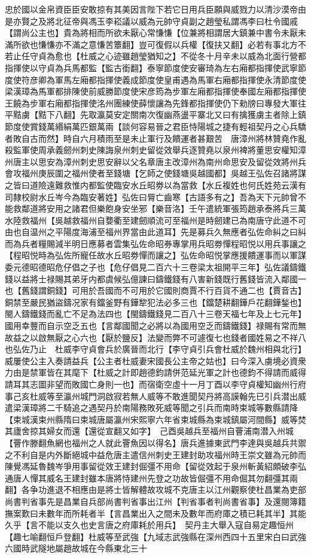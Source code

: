 忠於國以金帛資臣臣安敢掠有其美因言陛下若它日用兵臣願與威戮力以清沙漠帝由是亦賢之及將北征帝與馮玉李崧議以威為元帥守貞副之趙瑩私謂馮李曰杜令國戚【謂尚公主也】貴為將相而所欲未厭心常慊慊【位兼將相謂居大鎮兼中書令未厭未滿所欲也慊慊亦不滿之意慊苦簟翻】豈可復假以兵權【復扶又翻】必若有事北方不若止任守貞為愈也【杜威之心迹雖趙瑩猶知之】不從冬十月辛未以威為北面行營都指揮使以守貞為兵馬都監【監古銜翻】泰寧節度使安審琦為左右廂都指揮使武寧節度使符彦卿為軍馬左廂都指揮使義成節度使皇甫遇為馬軍右廂都指揮使永清節度使梁漢璋為馬軍都排陳使前威勝節度使宋彦筠為步軍左廂都指揮使奉國左廂都指揮使王饒為步軍右廂都指揮使洺州團練使薛懷讓為先鋒都指揮使仍下勑牓曰專發大軍往平黠虜【黠下八翻】先取瀛莫安定關南次復幽燕盪平寨北又曰有擒獲虜主者除上鎮節度使賞錢萬緡絹萬匹銀萬兩【談何容易晉之君臣恃陽城之捷有輕祖契丹之心兵驕者敗自古而然】時自六月積雨至是未止軍行及饋運者甚艱苦　唐漳州將林贊堯作亂殺監軍使周承義劒州刺史陳誨泉州刺史留從效舉兵逐贊堯以泉州裨將董思安權知漳州唐主以思安為漳州刺史思安辭以父名章唐主改漳州為南州命思安及留從效將州兵會攻福州庚辰圍之福州使者至錢塘【乞師之使錢塘吳越國都】吳越王弘佐召諸將謀之皆曰道險遠難救惟内都監使臨安水丘昭劵以為當救【水丘複姓也何氏姓苑云漢有司隸校尉水丘岑今為臨安著姓】弘佐曰脣亡齒寒【古語多有之】吾為天下元帥曾不能救鄰道將安用之諸君但樂飽身安坐邪【樂音洛】壬午遣統軍張筠趙承泰將兵三萬水陸救福州【吳越救福州自㜈衢至建劒順流可至福州是時劒建已為南唐守此道不可由也自温州之平陽度海浦至福州界當由此道耳】先是募兵久無應者弘佐命糾之曰糾而為兵者糧賜減半明日應募者雲集弘佐命昭券專掌用兵昭劵憚程昭悦以用兵事讓之【程昭悦時為弘佐所寵任故水丘昭劵憚而讓之】弘佐命昭悦掌應援饋運事而以軍謀委元德昭德昭危仔倡之子也【危仔倡見二百六十三卷梁太祖開平三年】弘佐議鑄鐵錢以益將士禄賜其弟牙内都虞候弘億諫曰鑄鐵錢有八害新錢既行舊錢皆流入鄰國一也【舊錢謂銅錢】可用於吾國而不可用於它國則商賈不行百貨不通二也【賈音古】銅禁至嚴民猶盜鑄况家有鐺釜野有鏵犂犯法必多三也【鐺楚耕翻鏵戶花翻鏵鍫也】閩人鑄鐵錢而亂亡不足為法四也【閩鑄鐵錢見二百八十三卷天福七年及上七元年】國用幸豐而自示空乏五也【言鄰國聞之必將以為國用空乏而鑄鐵錢】禄賜有常而無故益之以啟無厭之心六也【厭於鹽反】法變而弊不可遽復七也錢者國姓易之不祥八也弘佐乃止　杜威李守貞會兵於廣晉而北行【李守貞引兵會杜威於魏州相與北行】威屢使公主入奏請益兵【公主者杜威妻宋國長公主帝之姑也】曰今深入虜境必資衆力由是禁軍皆在其麾下【杜威之計即趙德鈞請併范延光軍之計也德鈞不得請而威得請耳其志圖非望而敗國亡身則一也】而宿衛空虛十一月丁酉以李守貞權知幽州行府事己亥杜威等至瀛州城門洞啟寂若無人威等不敢進聞契丹將高謨翰先已引兵潜出威遣梁漢璋將二千騎追之遇契丹於南陽務敗死威等聞之引兵而南時束城等數縣請降【束城漢束州縣隋曰束城唐屬瀛州宋熙寧六年省束城縣為束城鎮屬河間縣】威等焚其廬舍掠其婦女而還【還從宣翻又如字】　己酉吳越兵至福州自罾浦南潜入州城【罾作滕翻魚網也福州之人就此罾魚因以得名】唐兵進據東武門李達與吳越兵共禦之不利自是内外斷絕城中益危唐主遣信州刺史王建封助攻福州時王崇文雖為元帥而陳覺馮延魯魏岑爭用事留從效王建封倔彊不用命【留從效起于泉州斬黃紹頗破李弘通唐人憚其威名王建封雖本唐將恃建州先登之功故皆倔彊不用命倔其勿翻彊其兩翻】各争功進退不相應由是將士皆解體故攻城不克唐主以江州觀察使杜昌業為吏部尚書判省事先是昌業自兵部尚書判省事出江州【判省事者判尚書省事】及還閱簿籍撫案歎曰未數年而所耗者半【言昌業出入之間未及數年而府庫之積已耗其半】其能久乎【言不能以支久也史言唐之府庫耗於用兵】　契丹主大舉入寇自易定趣恒州【趣七喻翻恒戶登翻】杜威等至武強【九域志武強縣在深州西四十五里宋白曰武強六國時武隧地屬趙故城在今縣東北三十